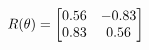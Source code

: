 \documentclass[preview]{standalone}
\begin{document}
\begin{align*}
\special{dvisvgm:raw <g id='unique000'>}R(\theta) = \begin{bmatrix}0.56 & -0.83\\0.83 & 0.56\end{bmatrix}\special{dvisvgm:raw </g>}
\end{align*}
\end{document}
